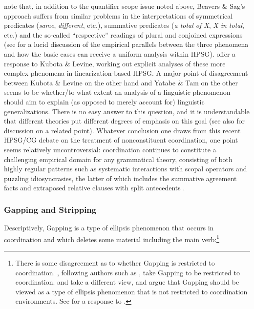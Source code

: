 \documentclass[output=paper
                ,modfonts
                ,nonflat
	        ,collection
	        ,collectionchapter
	        ,collectiontoclongg
 	        ,biblatex
                ,babelshorthands
                ,newtxmath
                ,draftmode
                ,colorlinks, citecolor=brown
]{./langsci/langscibook}
\begin{document}
\citet{kubota-levine-coord} note that, in addition to the quantifier
scope issue noted above, Beavers \& Sag's approach suffers from similar problems
in the interpretations of symmetrical predicates (\textit{same},
\textit{different}, etc.), summative predicates (\textit{a total of
X}, \textit{X in total}, etc.) and the so-called ``respective'' readings
of plural and conjoined expressions (see \citealt{chaves12} for a lucid
discussion of the empirical parallels between the three phenomena and
how the basic cases can receive a uniform analysis within HPSG).
\citet{yatabe-tam2017} offer a response to Kubota \& Levine, working out explicit
analyses of these more complex phenomena in linearization-based HPSG.
A major point of disagreement between Kubota \& Levine on the other
hand and Yatabe \& Tam on the other seems to be
whether/to what extent an analysis of a linguistic phenomenon
should aim to explain (as opposed to merely account for)
linguistic generalizations. There is no easy answer to this
question, and it is understandable that different theories put
different degrees of emphasis on this goal (see also
 for discussion on a related point).
Whatever conclusion one draws from this recent HPSG/CG debate on
the treatment of nonconstituent coordination, one point seems 
relatively uncontroversial: coordination continues to constitute a challenging
empirical domain for any grammatical theory,
consisting of both highly regular patterns such as systematic
interactions with scopal operators
\citep{kubota-levine-coord,KubotaLevineBook} and puzzling
idiosyncrasies, the latter of which includes the summative agreement
facts \citep{postalextraction,yatabe-tam2017} and extraposed relative
clauses with split antecedents
\citep{PerlmutterRoss70,yatabe-tam2017}.


\subsubsection{Gapping and Stripping \label{sec:gapping}}

Descriptively, Gapping is a type of ellipsis phenomenon that occurs in
coordination and which deletes some material including the main
verb:\footnote{There is some disagreement as to whether Gapping is
restricted to coordination. \citet{kubota-levine-gapping}, following
authors such as \citet{johnson2009}, take Gapping to be restricted to
coordination. \citet{parkea18gapping} and \citet{parkDiss} take a
different view, and argue that Gapping should be viewed as a type of
ellipsis phenomenon that is not restricted to coordination
environments. See \citet{KubotaLevineBook} for a response to
\citet{parkea18gapping}.}
\end{document}
